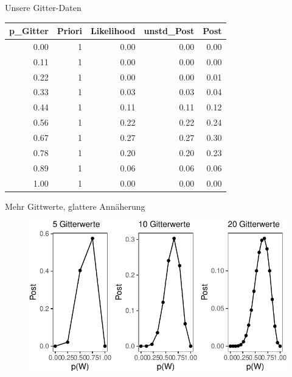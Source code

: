 \documentclass[
  ngerman,
  ignorenonframetext,
]{beamer}
\begin{document}
\begin{frame}{Unsere Gitter-Daten}
\protect\hypertarget{unsere-gitter-daten}{}
\begin{tabular}[t]{r|r|r|r|r}
\hline
p\_Gitter & Priori & Likelihood & unstd\_Post & Post\\
\hline
0.00 & 1 & 0.00 & 0.00 & 0.00\\
\hline
0.11 & 1 & 0.00 & 0.00 & 0.00\\
\hline
0.22 & 1 & 0.00 & 0.00 & 0.01\\
\hline
0.33 & 1 & 0.03 & 0.03 & 0.04\\
\hline
0.44 & 1 & 0.11 & 0.11 & 0.12\\
\hline
0.56 & 1 & 0.22 & 0.22 & 0.24\\
\hline
0.67 & 1 & 0.27 & 0.27 & 0.30\\
\hline
0.78 & 1 & 0.20 & 0.20 & 0.23\\
\hline
0.89 & 1 & 0.06 & 0.06 & 0.06\\
\hline
1.00 & 1 & 0.00 & 0.00 & 0.00\\
\hline
\end{tabular}
\end{frame}

\begin{frame}{Mehr Gittwerte, glattere Annäherung}
\protect\hypertarget{mehr-gittwerte-glattere-annuxe4herung}{}
\begin{figure}[H]
\includegraphics[width=1\linewidth]{unnamed-chunk-26-1} \end{figure}
\end{frame}
\end{document}
